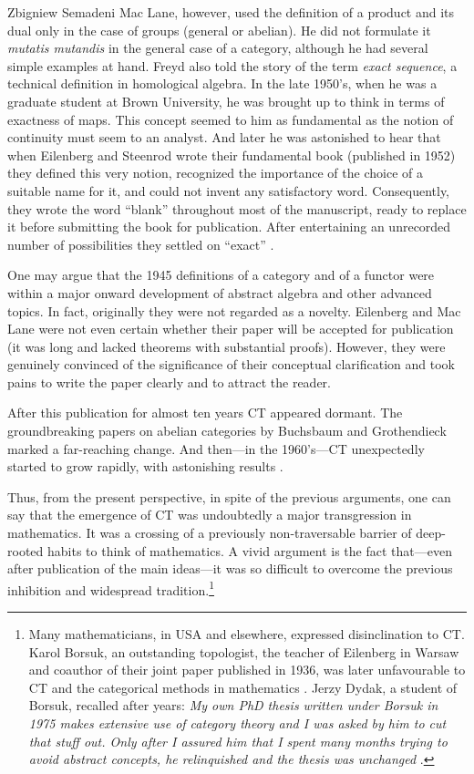 \begin{artengenv}{Zbigniew Semadeni}
\noindent Mac Lane, however, used the definition of a product and its dual only in 
the case of groups (general or abelian). He did not formulate it \textit{mutatis 
mutandis} in the general case of a category, although he had several simple examples 
at hand. 
Freyd also told the story of the term \textit{exact sequence}, a technical 
definition in homological algebra. In the late 1950's, when he was a graduate student 
at Brown University, he was brought up to think in terms of exactness of maps. 
This concept seemed to him as fundamental as the notion of continuity must seem 
to an analyst. And later he was astonished to hear that when Eilenberg and  
Steenrod wrote their fundamental book \parencite{Steenrod} (published in 1952) they 
defined this very notion, recognized the importance of the choice of a suitable 
name for it, and could not invent any satisfactory word. Consequently, they 
wrote the word ``blank'' throughout most of the manuscript, ready to replace it 
before submitting the book for publication. After entertaining an unrecorded number 
of possibilities they settled on ``exact'' \parencite[p.157]{Freyd}. 

One may argue that the 1945 definitions of a category and of a functor were within a 
major onward development of abstract algebra and other advanced topics. In fact, 
originally they were not regarded as a novelty. Eilenberg and Mac Lane were not even 
certain whether their paper will be accepted for publication (it was long and lacked 
theorems with substantial proofs). However, they were genuinely convinced of the 
significance of their conceptual clarification and took pains to write the paper 
clearly and to attract the reader. 

After this publication for almost ten years CT appeared dormant. The groundbreaking 
papers on abelian categories by Buchsbaum and Gro\-then\-dieck marked 
a far-reaching change. And then---in the 1960's---CT unexpectedly started to 
grow rapidly, with astonishing results \parencite[pp.338--339, 341--361]{Century}.

Thus, from the present perspective, in spite of the previous arguments, one can say 
that the emergence of CT was undoubtedly a major transgression in mathematics. 
It was a crossing of a previously non-traversable barrier of deep-rooted habits to 
think of mathematics. A vivid argument is the fact that---even after publication 
of the main ideas---it was so difficult to overcome the previous inhibition 
and widespread tradition.\footnote{Many mathematicians, in USA and elsewhere, 
expressed disinclination to CT. Karol Borsuk, an outstanding topologist, the 
teacher of Eilenberg in Warsaw and coauthor of their joint paper published in 1936, 
was later unfavourable to CT and the categorical methods in mathematics 
\parencite[p.30]{Jackowski}. Jerzy Dydak, a student of Borsuk, recalled after years: 
\textit{My own PhD thesis written under Borsuk in 1975 makes extensive use 
of category theory and I was asked by him to cut that stuff out. Only after 
I assured him that I spent many months trying to avoid abstract concepts, he 
relinquished and the thesis was unchanged} \parencite[p.92]{Dydak}. } %


\end{artengenv}

